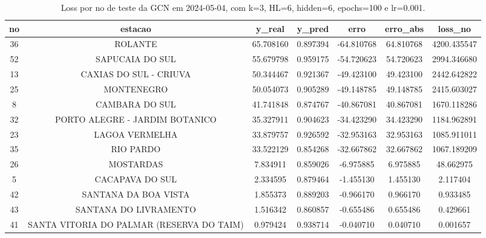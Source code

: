\begin{table}[h]
\centering
\caption{Loss por no de teste da GCN em 2024-05-04, com k=3, HL=6, hidden=6, epochs=100 e lr=0.001.}
\label{tab:gcn_loss_k3_hl6_h6_e100_d20240504}
\begin{tabular}{ccccccc}
\toprule
no & estacao & y\_real & y\_pred & erro & erro\_abs & loss\_no \\
\midrule
36 & ROLANTE & 65.708160 & 0.897394 & -64.810768 & 64.810768 & 4200.435547 \\
52 & SAPUCAIA DO SUL & 55.679798 & 0.959175 & -54.720623 & 54.720623 & 2994.346680 \\
13 & CAXIAS DO SUL - CRIUVA & 50.344467 & 0.921367 & -49.423100 & 49.423100 & 2442.642822 \\
25 & MONTENEGRO & 50.054073 & 0.905289 & -49.148785 & 49.148785 & 2415.603027 \\
8 & CAMBARA DO SUL & 41.741848 & 0.874767 & -40.867081 & 40.867081 & 1670.118286 \\
32 & PORTO ALEGRE - JARDIM BOTANICO & 35.327911 & 0.904623 & -34.423290 & 34.423290 & 1184.962891 \\
23 & LAGOA VERMELHA & 33.879757 & 0.926592 & -32.953163 & 32.953163 & 1085.911011 \\
35 & RIO PARDO & 33.522129 & 0.854268 & -32.667862 & 32.667862 & 1067.189209 \\
26 & MOSTARDAS & 7.834911 & 0.859026 & -6.975885 & 6.975885 & 48.662975 \\
5 & CACAPAVA DO SUL & 2.334595 & 0.879464 & -1.455130 & 1.455130 & 2.117404 \\
42 & SANTANA DA BOA VISTA & 1.855373 & 0.889203 & -0.966170 & 0.966170 & 0.933485 \\
43 & SANTANA DO LIVRAMENTO & 1.516342 & 0.860857 & -0.655486 & 0.655486 & 0.429661 \\
41 & SANTA VITORIA DO PALMAR (RESERVA DO TAIM) & 0.979424 & 0.938714 & -0.040710 & 0.040710 & 0.001657 \\
\bottomrule
\end{tabular}
\end{table}
